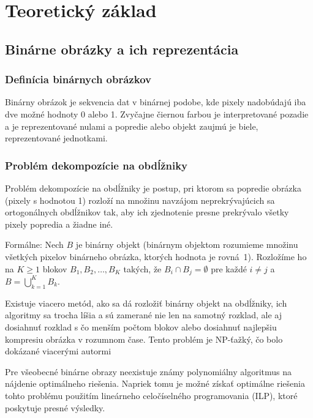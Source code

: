 \section{Teoretický základ}\label{sec:teoreticky-zaklad}

\subsection{Binárne obrázky a ich reprezentácia}\label{subsec:binarne-obrazky-a-ich-reprezentacia}

\subsubsection{Definícia binárnych obrázkov}

\hspace{0.5cm}
Binárny obrázok je sekvencia dat v binárnej podobe, kde pixely nadobúdajú iba dve možné hodnoty 0 alebo 1.
Zvyčajne čiernou farbou je interpretované pozadie a je reprezentované nulami a popredie alebo objekt zaujmú je biele,
reprezentované jednotkami.

\subsubsection{Problém dekompozície na obdĺžniky}

\hspace{0.5cm}
Problém dekompozície na obdĺžniky je postup, pri ktorom sa popredie obrázka (pixely s hodnotou 1) rozloží na
množinu navzájom neprekrývajúcich sa ortogonálnych obdĺžnikov tak, aby ich zjednotenie presne prekrývalo všetky
pixely popredia a žiadne iné.

Formálne: Nech $B$ je binárny objekt (binárnym objektom rozumieme množinu všetkých pixelov binárneho obrázka,
ktorých hodnota je rovná~1).
Rozložíme ho na $K \geq 1$ blokov $B_1, B_2, \ldots, B_K$ takých,
že $B_i \cap B_j = \emptyset$ pre každé $i \neq j$ a $B = \bigcup_{k=1}^{K} B_k$. \parencite{SUK20124279}

Existuje viacero metód, ako sa dá rozložiť binárny objekt na obdĺžniky, ich algoritmy sa trocha líšia a sú zamerané nie len
na samotný rozklad, ale aj dosiahnuť rozklad s čo menším počtom blokov alebo dosiahnuť najlepšiu kompresiu obrázka v rozumnom čase.
Tento problém je NP-ťažký, čo bolo dokázané viacerými autormi \parencite{hanauer2024covering,masek1978np,najman2014covering}

Pre všeobecné binárne obrazy neexistuje známy polynomiálny algoritmus na nájdenie optimálneho riešenia.
Napriek tomu je možné získať optimálne riešenia tohto problému použitím lineárneho celočíselného programovania (ILP),
ktoré poskytuje presné výsledky.


